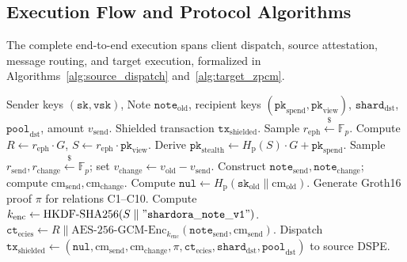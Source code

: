 \documentclass[sigconf,nonacm]{acmart}
\begin{document}
\subsection{Execution Flow and Protocol Algorithms}
The complete end-to-end execution spans client dispatch, source attestation, message routing, and target execution, formalized in Algorithms~\ref{alg:source_dispatch} and~\ref{alg:target_zpcm}.

\begin{algorithm}[h]
\caption{Client Generation and Source Shard Submission}
\label{alg:source_dispatch}
\begin{algorithmic}[1]
\Require Sender keys $(\mathtt{sk}, \mathtt{vsk})$, Note $\mathtt{note}_{\text{old}}$, recipient keys $(\mathtt{pk}_{\text{spend}}, \mathtt{pk}_{\text{view}})$, $\mathtt{shard}_{\text{dst}}$, $\mathtt{pool}_{\text{dst}}$, amount $v_{\text{send}}$.
\Ensure Shielded transaction $\mathtt{tx}_{\text{shielded}}$.
\State Sample $r_{\text{eph}} \xleftarrow{\$} \mathbb{F}_p$.
\State Compute $R \leftarrow r_{\text{eph}} \cdot G$, $S \leftarrow r_{\text{eph}} \cdot \mathtt{pk}_{\text{view}}$.
\State Derive $\mathtt{pk}_{\text{stealth}} \leftarrow H_{\text{p}}(S) \cdot G + \mathtt{pk}_{\text{spend}}$.
\State Sample $r_{\text{send}}, r_{\text{change}} \xleftarrow{\$} \mathbb{F}_p$; set $v_{\text{change}} \leftarrow v_{\text{old}} - v_{\text{send}}$.
\State Construct $\mathtt{note}_{\text{send}}, \mathtt{note}_{\text{change}}$; compute $\text{cm}_{\text{send}}, \text{cm}_{\text{change}}$.
\State Compute $\mathtt{nul} \leftarrow H_{\text{p}}(\mathtt{sk}_{\text{old}} \parallel \text{cm}_{\text{old}})$.
\State Generate Groth16 proof $\pi$ for relations C1--C10.
\State Compute $k_{\text{enc}} \leftarrow \text{HKDF-SHA256}(S \parallel \mathtt{"shardora\_note\_v1"})$.
\State $\mathtt{ct}_{\text{ecies}} \leftarrow R \parallel \text{AES-256-GCM-Enc}_{k_{\text{enc}}}(\mathtt{note}_{\text{send}}, \text{cm}_{\text{send}})$.
\State Dispatch $\mathtt{tx}_{\text{shielded}} \leftarrow (\mathtt{nul}, \text{cm}_{\text{send}}, \text{cm}_{\text{change}}, \pi, \mathtt{ct}_{\text{ecies}}, \mathtt{shard}_{\text{dst}}, \mathtt{pool}_{\text{dst}})$ to source DSPE.
\end{algorithmic}
\end{algorithm}
\end{document}
